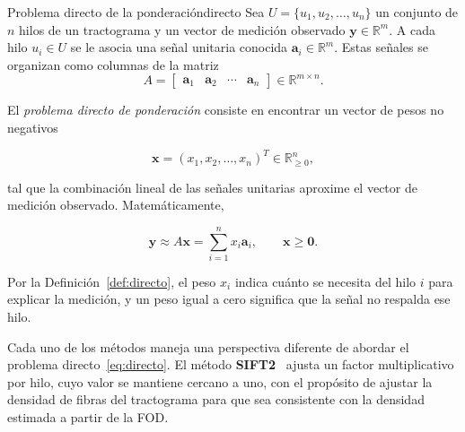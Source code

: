 \documentclass[11pt,a4paper]{article}
\begin{document}
\begin{definicion}{Problema directo de la ponderación}{directo}
Sea $U=\{u_1,u_2,\ldots,u_n\}$ un conjunto de $n$ hilos de un tractograma y un vector de medición observado
$\mathbf{y}\in\mathbb{R}^{m}$. A cada hilo $u_i\in U$ se le asocia una señal unitaria conocida $\mathbf{a}_i\in\mathbb{R}^{m}$. Estas señales se organizan como columnas de
la matriz
\[
A=
\begin{bmatrix}
\mathbf{a}_1 & \mathbf{a}_2 & \cdots & \mathbf{a}_n
\end{bmatrix}
\in\mathbb{R}^{m\times n}.
\]

El \textit{problema directo de ponderación} consiste en encontrar un vector de pesos no negativos

\[
\mathbf{x}=
(x_1,x_2,\ldots,x_n)^T
\in\mathbb{R}_{\geq 0}^{n},
\]

tal que la combinación lineal de las señales unitarias aproxime el vector de medición
observado. Matemáticamente,

\begin{equation}\label{eq:directo}
\boxed{
\mathbf{y}\approx A\mathbf{x}
=\sum_{i=1}^{n}x_i\mathbf{a}_i,
\qquad \mathbf{x}\geq\mathbf{0}.
}
\end{equation}

\end{definicion}

Por la Definición~\ref{def:directo}, el peso $x_i$ indica cuánto se necesita del hilo $i$ para explicar la medición, y un peso igual a cero significa que la señal no respalda ese hilo.

Cada uno de los métodos maneja una perspectiva diferente de abordar el problema directo~\eqref{eq:directo}. El método \textbf{SIFT2}~\cite{smith2015} ajusta un factor multiplicativo por hilo, cuyo valor se mantiene cercano a uno, con el propósito de ajustar la densidad de fibras del tractograma para que sea consistente con la densidad estimada a partir de la FOD. 
\end{document}
